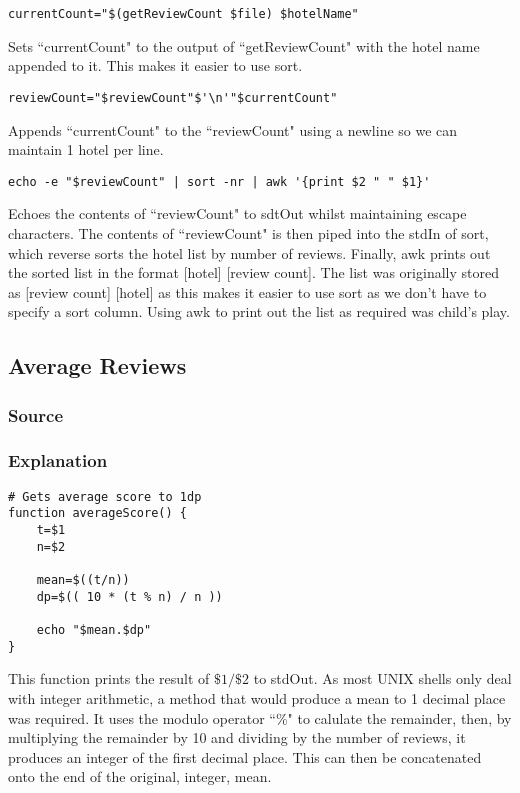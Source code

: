 \documentclass[a4paper]{article}
\begin{document}
\begin{lstlisting}
currentCount="$(getReviewCount $file) $hotelName"
\end{lstlisting}
Sets ``currentCount" to the output of ``getReviewCount" with the hotel name appended to it. This makes it easier to use sort.

\begin{lstlisting}
reviewCount="$reviewCount"$'\n'"$currentCount"
\end{lstlisting}
Appends ``currentCount" to the ``reviewCount" using a newline so we can maintain 1 hotel per line.

\begin{lstlisting}
echo -e "$reviewCount" | sort -nr | awk '{print $2 " " $1}'
\end{lstlisting}
Echoes the contents of ``reviewCount" to sdtOut whilst maintaining escape characters.
The contents of ``reviewCount" is then piped into the stdIn of sort, which reverse sorts the hotel list by number of reviews.
Finally, awk prints out the sorted list in the format [hotel] [review count].
The list was originally stored as [review count] [hotel] as this makes it easier to use sort as we don't have to specify a sort column.
Using awk to print out the list as required was child's play.

%
\newpage
\subsection{Average Reviews}
\subsubsection{Source}


\newpage
\subsubsection{Explanation}
\begin{lstlisting}
# Gets average score to 1dp
function averageScore() {
	t=$1
	n=$2
	
	mean=$((t/n))
	dp=$(( 10 * (t % n) / n ))
	
	echo "$mean.$dp"
}
\end{lstlisting}
This function prints the result of $\$1 / \$2 $ to stdOut.
As most UNIX shells only deal with integer arithmetic, a method that would produce a mean to 1 decimal place was required.
It uses the modulo operator ``\%" to calulate the remainder, then, by multiplying the remainder by 10 and dividing by the number of reviews, it produces an integer of the first decimal place.
This can then be concatenated onto the end of the original, integer, mean.
\end{document}
